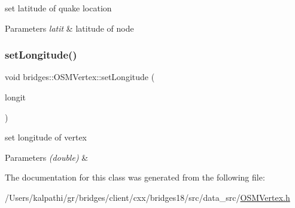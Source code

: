 set latitude of quake location


\begin{DoxyParams}{Parameters}
{\em latit} & latitude of node \\
\hline
\end{DoxyParams}
\mbox{\label{classbridges_1_1_o_s_m_vertex_a80cdc32c79a8f2e5c962be3856b75229}} 
\subsubsection{\texorpdfstring{set\+Longitude()}{setLongitude()}}
{\footnotesize\ttfamily void bridges\+::\+O\+S\+M\+Vertex\+::set\+Longitude (\begin{DoxyParamCaption}\item[{double}]{longit }\end{DoxyParamCaption})\hspace{0.3cm}{\ttfamily [inline]}}

set longitude of vertex


\begin{DoxyParams}{Parameters}
{\em (double)} & \\
\hline
\end{DoxyParams}


The documentation for this class was generated from the following file\+:\begin{DoxyCompactItemize}
\item 
/\+Users/kalpathi/gr/bridges/client/cxx/bridges18/src/data\+\_\+src/\mbox{\hyperlink{_o_s_m_vertex_8h}{O\+S\+M\+Vertex.\+h}}\end{DoxyCompactItemize}
